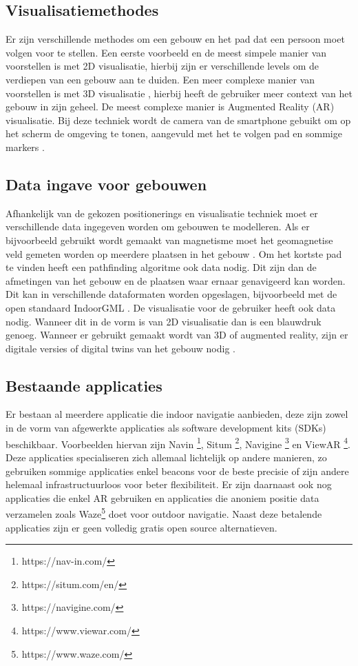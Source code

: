 \subsection{Visualisatiemethodes}
Er zijn verschillende methodes om een gebouw en het pad dat een persoon moet volgen voor te stellen.
Een eerste voorbeeld en de meest simpele manier van voorstellen is met 2D visualisatie, hierbij zijn er verschillende levels om de verdiepen van een gebouw aan te duiden.
Een meer complexe manier van voorstellen is met 3D visualisatie \autocite{Guo2021}, hierbij heeft de gebruiker meer context van het gebouw in zijn geheel.
De meest complexe manier is Augmented Reality (AR) visualisatie. Bij deze techniek wordt de camera van de smartphone gebuikt om op het scherm de omgeving te tonen, aangevuld met het te volgen pad en sommige markers \autocite{Khan2019}.
 
\subsection{Data ingave voor gebouwen}
Afhankelijk van de gekozen positionerings en visualisatie techniek moet er verschillende data ingegeven worden om gebouwen te modelleren. Als er bijvoorbeeld gebruikt wordt gemaakt van magnetisme moet het geomagnetise veld gemeten worden op meerdere plaatsen in het gebouw \autocite{Li2013}.
Om het kortste pad te vinden heeft een pathfinding algoritme ook data nodig. Dit zijn dan de afmetingen van het gebouw en de plaatsen waar ernaar genavigeerd kan worden. Dit kan in verschillende dataformaten worden opgeslagen, bijvoorbeeld met de open standaard IndoorGML \autocite{Li2016}.
De visualisatie voor de gebruiker heeft ook data nodig. Wanneer dit in de vorm is van 2D visualisatie dan is een blauwdruk genoeg. Wanneer er gebruikt gemaakt wordt van 3D of augmented reality, zijn er digitale versies of digital twins van het gebouw nodig \autocite{Deng2022}.

\subsection{Bestaande applicaties}
Er bestaan al meerdere applicatie die indoor navigatie aanbieden, deze zijn zowel in de vorm van afgewerkte applicaties als software development kits (SDKs) beschikbaar. Voorbeelden hiervan zijn
Navin \footnote{https://nav-in.com/}, Situm \footnote{https://situm.com/en/}, Navigine \footnote{https://navigine.com/} en ViewAR \footnote{https://www.viewar.com/}. 
Deze applicaties specialiseren zich allemaal lichtelijk op andere manieren, zo gebruiken sommige applicaties enkel beacons voor de beste precisie of zijn andere helemaal infrastructuurloos voor beter flexibiliteit. Er zijn daarnaast ook nog applicaties die enkel AR gebruiken en applicaties die anoniem positie data verzamelen zoals Waze\footnote{https://www.waze.com/} doet voor outdoor navigatie. Naast deze betalende applicaties zijn er geen volledig gratis open source alternatieven.

